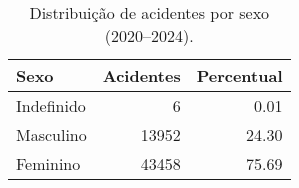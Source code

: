 \begin{table}
\caption{Distribuição de acidentes por sexo (2020–2024).}
\begin{tabular}{lrr}
\toprule
Sexo & Acidentes & Percentual \\
\midrule
Indefinido & 6 & 0.01 \\
Masculino & 13952 & 24.30 \\
Feminino & 43458 & 75.69 \\
\bottomrule
\end{tabular}
\end{table}
